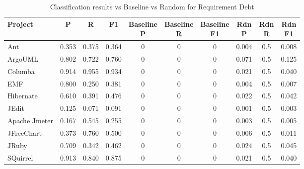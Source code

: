 \begin{table}[!hbt]
    \begin{center}
        \caption{Classification results vs Baseline vs Random for Requirement Debt}
        \label{tbl:classifier_results_vs_baseline_requirement}
        \begin{tabular}{l| c c c c c c c c c}
        \toprule
        \textbf{Project} & \textbf{P} & \textbf{R} & \textbf{F1} & \thead{Baseline\\P} & \thead{Baseline\\R} & \thead{Baseline\\F1} & \thead{Rdn\\P} & \thead{Rdn\\R} & \thead{Rdn\\F1} \\
        \midrule
        Ant           & 0.353 &  0.375 & 0.364 & 0 & 0 & 0 & 0.004 &0.5 & 0.008  \\
        ArgoUML       & 0.802 &  0.722 & 0.760 & 0 & 0 & 0 & 0.071 &0.5 & 0.125  \\
        Columba       & 0.914 &  0.955 & 0.934 & 0 & 0 & 0 & 0.021 &0.5 & 0.040  \\
        EMF           & 0.800 &  0.250 & 0.381 & 0 & 0 & 0 & 0.004 &0.5 & 0.007  \\
        Hibernate     & 0.610 &  0.391 & 0.476 & 0 & 0 & 0 & 0.022 &0.5 & 0.042  \\
        JEdit         & 0.125 &  0.071 & 0.091 & 0 & 0 & 0 & 0.001 &0.5 & 0.003  \\
        Apache Jmeter & 0.167 &  0.545 & 0.255 & 0 & 0 & 0 & 0.003 &0.5 & 0.005  \\
        JFreeChart    & 0.373 &  0.760 & 0.500 & 0 & 0 & 0 & 0.006 &0.5 & 0.011  \\
        JRuby         & 0.709 &  0.342 & 0.462 & 0 & 0 & 0 & 0.024 &0.5 & 0.045  \\
        SQuirrel      & 0.913 &  0.840 & 0.875 & 0 & 0 & 0 & 0.021 &0.5 & 0.040  \\
        \bottomrule
        \end{tabular}
    \end{center}    
\end{table}

\clearpage

